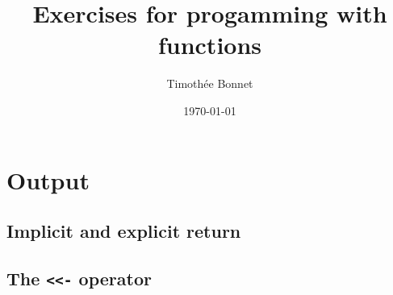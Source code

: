 \documentclass[12pt,a4paper]{scrartcl}\usepackage[]{graphicx}\usepackage[]{color}
\title{Exercises for progamming with functions}
\date{\today}
\author{Timoth\'ee Bonnet}
\begin{document}
\maketitle

\tableofcontents
\ListOfExerciseInToc
{}

\clearpage


\section{Output}
\subsection{Implicit and explicit return}

\subsection{The \texttt{<<-} operator}
\end{document}

